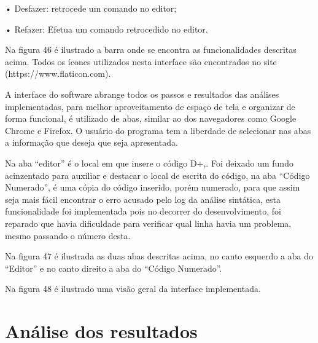 \documentclass[12pt,oneside,a4paper,chapter=TITLE,section=TITLE,sumario=tradicional]{abntex2}
\begin{document}
•	Desfazer: retrocede um comando no editor;

•	Refazer: Efetua um comando retrocedido no editor.

Na figura 46 é ilustrado a barra onde se encontra as funcionalidades descritas acima. Todos os ícones utilizados nesta interface são encontrados no site (https://www.flaticon.com).

\begin{figure}[htb]
\end{figure} 

A interface do software abrange todos os passos e resultados das análises implementadas, para melhor aproveitamento de espaço de tela e organizar de forma funcional, é utilizado de abas, similar ao dos navegadores como Google Chrome e Firefox. O usuário do programa tem a liberdade de selecionar nas abas a informação que deseja que seja apresentada. 

Na aba “editor” é o local em que insere o código D+,. Foi deixado um fundo acinzentado para auxiliar e destacar o local de escrita do código, na aba “Código Numerado”, é uma cópia do código inserido, porém numerado, para que assim seja mais fácil encontrar o erro acusado pelo log da análise sintática, esta funcionalidade foi implementada pois no decorrer do desenvolvimento, foi reparado que havia dificuldade para verificar qual linha havia um problema, mesmo passando o número desta. 

Na figura 47 é ilustrada as duas abas descritas acima, no canto esquerdo a aba do “Editor” e no canto direito a aba do “Código Numerado”. 

\begin{figure}[htb]
\end{figure}

Na figura 48 é ilustrado uma visão geral da interface implementada. 

\begin{figure}[htb]
\end{figure}


\chapter{Análise dos resultados}
\label{cap:analiseresultados}
\end{document}
